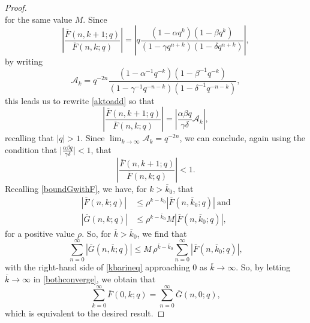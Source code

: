 \documentclass[10pt,a4paper]{amsart}
\begin{document}
\begin{proof}
\begin{equation}
\end{equation}
 for the same value $M$. Since 
\begin{equation}\label{aktoadd}
 \left| \frac{\overline{F}(n, k+1;q)}{\overline{F}(n,k;q)} \right|    = \left| q \frac{ \left( 1 - \alpha q^{k} \right) \left( 1 - \beta q^{k} 
 \right) }{ \left( 1 - \gamma q^{n+k} \right) \left( 1 - \delta q^{n+k} \right) } \right|, 
\end{equation}
 by writing   $$ \mathcal{A}_{k} = q^{-2n} \frac{\left( 1 - \alpha^{-1} q^{-k} \right) 
 \left( 1 - \beta^{-1} q^{-k} \right) }{ \left( 1 - \gamma^{-1} q^{-n-k} \right) \left( 1 - 
 \delta^{-1} q^{-n-k} \right) }, $$
 this leads us to rewrite \eqref{aktoadd} so that 
\begin{equation*}
 \left| \frac{\overline{F}(n, k+1;q)}{\overline{F}(n,k;q)} \right| 
 = \left| \frac{\alpha \beta q}{\gamma \delta} \mathcal{A}_{k} \right|, 
\end{equation*}
 recalling that $|q| > 1$.  Since $\lim_{k \to \infty} \mathcal{A}_{k} = q^{-2n}$,   we can conclude, again using the condition that $\big|  
 \frac{\alpha \beta q}{\gamma \delta} \big| < 1$,  that 
\begin{equation*}
 \left| \frac{\overline{F}(n, k+1;q)}{\overline{F}(n,k;q)} \right|  < 1. 
\end{equation*}
 Recalling \eqref{boundGwithF}, we have, for $k > \overline{k}_{0}$, that 
\begin{align*}
 \left| \overline{F}(n, k; q) \right| & \leq \rho^{k - \overline{k}_{0}} \left| \overline{F}(n, \overline{k}_{0}; q) \right| \ \text{and} \\ 
 \left| \overline{G}(n, k;q) \right| & \leq \rho^{k - \overline{k}_{0}} M \left| \overline{F}(n, \overline{k}_{0}; q) \right|, 
\end{align*}
 for a positive value $\rho$. 
 So, for $\overline{k} > \overline{k}_{0}$, we find that
\begin{equation}\label{kbarineq}
 \sum_{n=0}^{\infty} \left| \overline{G}(n, \overline{k};q) \right| 
 \leq M \, \rho^{\overline{k} - \overline{k}_{0}} \sum_{n=0}^{\infty} \left| \overline{F}(n, \overline{k}_{0}; q) \right|, 
\end{equation} 
 with the right-hand side of \eqref{kbarineq} approaching $0$
 as $\overline{k} \to \infty$. 
 So, by letting $\overline{k} \to \infty$ in \eqref{bothconverge}, 
 we obtain that 
 $$ \sum_{k=0}^{\infty} \overline{F}(0, k;q) = \sum_{n=0}^{\infty} \overline{G}(n,0;q), $$
 which is equivalent to the desired result. 
\end{proof}
\end{document}
